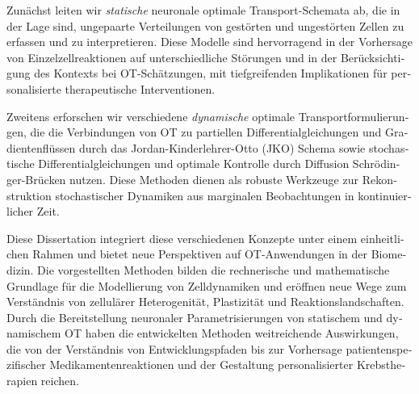 \begin{otherlanguage}{ngerman}
Zun{\"a}chst leiten wir \emph{statische} neuronale optimale Transport-Schemata ab, die in der Lage sind, ungepaarte Verteilungen von gest{\"o}rten und ungest{\"o}rten Zellen zu erfassen und zu interpretieren. Diese Modelle sind hervorragend in der Vorhersage von Einzelzellreaktionen auf unterschiedliche St{\"o}rungen und in der Ber{\"u}cksichtigung des Kontexts bei OT-Sch{\"a}tzungen, mit tiefgreifenden Implikationen f{\"u}r personalisierte therapeutische Interventionen.

Zweitens erforschen wir verschiedene \emph{dynamische} optimale Transportformulierungen, die die Verbindungen von OT zu partiellen Differentialgleichungen und Gradientenfl{\"u}ssen durch das Jordan-Kinderlehrer-Otto (JKO) Schema sowie stochastische Differentialgleichungen und optimale Kontrolle durch Diffusion Schr{\"o}dinger-Br{\"u}cken nutzen. Diese Methoden dienen als robuste Werkzeuge zur Rekonstruktion stochastischer Dynamiken aus marginalen Beobachtungen in kontinuierlicher Zeit.

Diese Dissertation integriert diese verschiedenen Konzepte unter einem einheitlichen Rahmen und bietet neue Perspektiven auf OT-Anwendungen in der Biomedizin. Die vorgestellten Methoden bilden die rechnerische und mathematische Grundlage f{\"u}r die Modellierung von Zelldynamiken und er{\"o}ffnen neue Wege zum Verst{\"a}ndnis von zellul{\"a}rer Heterogenit{\"a}t, Plastizit{\"a}t und Reaktionslandschaften. Durch die Bereitstellung neuronaler Parametrisierungen von statischem und dynamischem OT haben die entwickelten Methoden weitreichende Auswirkungen, die von der Verst{\"a}ndnis von Entwicklungspfaden bis zur Vorhersage patientenspezifischer Medikamentenreaktionen und der Gestaltung personalisierter Krebstherapien reichen.

\end{otherlanguage}

\endgroup

\vfill